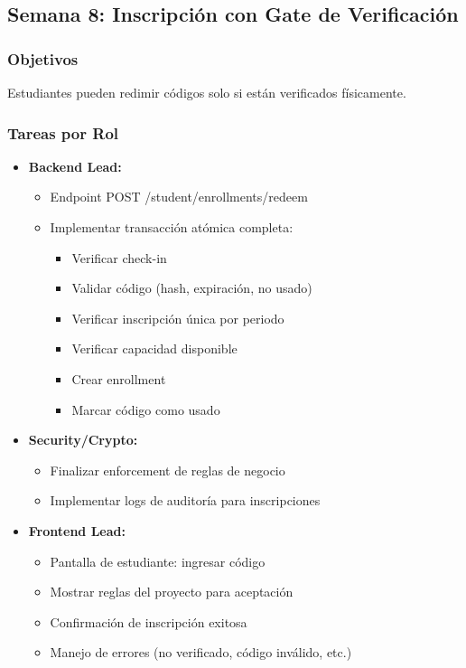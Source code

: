 \documentclass[12pt,a4paper]{article}
\begin{document}
\subsection{Semana 8: Inscripción con Gate de Verificación}

\subsubsection{Objetivos}
Estudiantes pueden redimir códigos solo si están verificados físicamente.

\subsubsection{Tareas por Rol}

\begin{itemize}[leftmargin=*]
    \item \textbf{Backend Lead:}
    \begin{itemize}
        \item Endpoint POST /student/enrollments/redeem
        \item Implementar transacción atómica completa:
        \begin{itemize}
            \item Verificar check-in
            \item Validar código (hash, expiración, no usado)
            \item Verificar inscripción única por periodo
            \item Verificar capacidad disponible
            \item Crear enrollment
            \item Marcar código como usado
        \end{itemize}
    \end{itemize}
    
    \item \textbf{Security/Crypto:}
    \begin{itemize}
        \item Finalizar enforcement de reglas de negocio
        \item Implementar logs de auditoría para inscripciones
    \end{itemize}
    
    \item \textbf{Frontend Lead:}
    \begin{itemize}
        \item Pantalla de estudiante: ingresar código
        \item Mostrar reglas del proyecto para aceptación
        \item Confirmación de inscripción exitosa
        \item Manejo de errores (no verificado, código inválido, etc.)
    \end{itemize}
    

\end{itemize}
\end{document}
